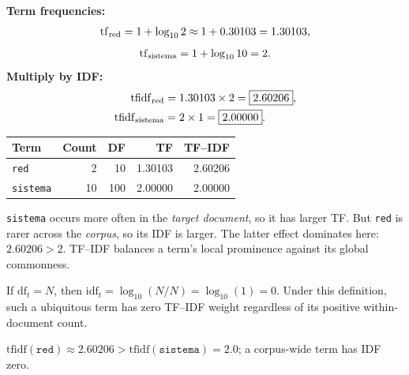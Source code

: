 \textbf{Term frequencies:}
\[
\mathrm{tf}_{\rm red}=1+\log_{10}2\approx1+0.30103=1.30103,
\]
\[
\mathrm{tf}_{\rm sistema}=1+\log_{10}10=2.
\]
\textbf{Multiply by IDF:}
\[
\begin{aligned}
\mathrm{tfidf}_{\rm red}&=1.30103\times2=\boxed{2.60206},\\
\mathrm{tfidf}_{\rm sistema}&=2\times1=\boxed{2.00000}.
\end{aligned}
\]
\begin{center}\begin{tabular}{@{}lrrrr@{}}\toprule Term&Count&DF&TF&TF--IDF\\\midrule
\texttt{red}&2&10&1.30103&2.60206\\
\texttt{sistema}&10&100&2.00000&2.00000\\\bottomrule
\end{tabular}\end{center}

\texttt{sistema} occurs more often in the \emph{target document}, so it has larger TF. But \texttt{red} is rarer across the \emph{corpus}, so its IDF is larger. The latter effect dominates here: $2.60206>2$. TF--IDF balances a term's local prominence against its global commonness.

If $\mathrm{df}_t=N$, then $\mathrm{idf}_t=\log_{10}(N/N)=\log_{10}(1)=\boxed{0}$. Under this definition, such a ubiquitous term has zero TF--IDF weight regardless of its positive within-document count.
\begin{answer}
$\boxed{\mathrm{tfidf}(\texttt{red})\approx2.60206>\mathrm{tfidf}(\texttt{sistema})=2.0}$; a corpus-wide term has IDF zero.
\end{answer}

